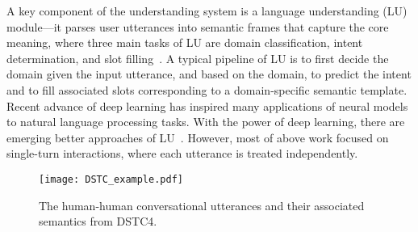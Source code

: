 \documentclass[11pt,letterpaper]{article}
\begin{document}
A key component of the understanding system is a language understanding (LU) module---it parses user utterances into semantic frames that capture the core meaning, where three main tasks of LU are domain classification, intent determination, and slot filling~\cite{tur2011spoken}.
A typical pipeline of LU is to first decide the domain given the input utterance, and based on the domain, to predict the intent and to fill associated slots corresponding to a domain-specific semantic template.
Recent advance of deep learning has inspired many applications of neural models to natural language processing tasks. With the power of deep learning, there are emerging better approaches of LU~\cite{hakkani2016multi,chen2016knowledge,chen2016syntax,wang2016learning}.
However, most of above work focused on single-turn interactions, where each utterance is treated independently.


\begin{figure*}[t]
\centering
\texttt{[image: DSTC\_example.pdf]}
\vspace{-3mm}
\caption{The human-human conversational utterances and their associated semantics from DSTC4.}
\label{fig:example}
\end{figure*}
\end{document}
